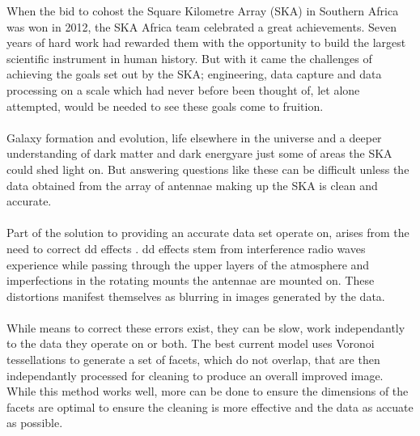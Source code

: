 When the bid to cohost the Square Kilometre Array (SKA) in Southern Africa was won in 2012, the SKA Africa team celebrated a great achievements. Seven years of hard work had rewarded them with the opportunity to build the largest scientific instrument in human history. But with it came the challenges of achieving the goals set out by the SKA; engineering, data capture and data processing on a scale which had never before been thought of, let alone attempted, would be needed to see these goals come to fruition.
\\
\\
Galaxy formation and evolution, life elsewhere in the universe and a deeper understanding of dark matter and dark energy\footnotemark are just some of areas the SKA could shed light on. But answering questions like these can be difficult unless the data obtained from the array of antennae making up the SKA is clean and accurate.
\\
\\
Part of the solution to providing an accurate data set operate on, arises from the need to correct \gls{dd} effects \citep{smirnov2011revisiting}. \gls{dd} effects stem from interference radio waves experience while passing through the upper layers of the atmosphere and imperfections in the rotating mounts the antennae are mounted on. These distortions manifest themselves as blurring in images generated by the data.
\\
\\
While means to correct these errors exist, they can be slow, work independantly to the data they operate on or both. The best current model uses Voronoi tessellations \citep{okabe2009spatial} to generate a set of facets, which do not overlap, that are then independantly processed for cleaning to produce an overall improved image. While this method works well, more can be done to ensure the dimensions of the facets are optimal to ensure the cleaning is more effective and the data as accuate as possible.
